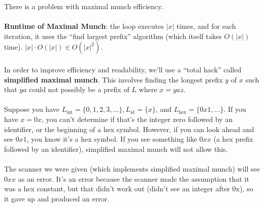 \documentclass[]{article}
\theoremstyle{definition}
\begin{document}
				There is a problem with maximal munch \textendash{} efficiency.
				\\ \\
				\textbf{Runtime of Maximal Munch}: the loop executes $|x|$ times, and for each iteration, it uses the ``find largest prefix'' algorithm (which itself takes $O(|x|)$ time). $|x| \cdot O(|x|) \in O(|x|^2)$.
				\\ \\
				In order to improve efficiency and readability, we'll use a ``total hack'' called \textbf{simplified maximal munch}. This involves finding the longest prefix $y$ of $x$ such that $ya$ could not possibly be a prefix of $L$ where $x = yaz$.
				\\ \\
				Suppose you have $L_{\text{int}} = \{0, 1, 2, 3, \ldots\}, L_{\text{id}} = \{x\}$, and $L_{\text{hex}} = \{0x1, \ldots\}$. If you have $x = 0x$, you can't determine if that's the integer zero followed by an identifier, or the beginning of a hex symbol. However, if you can look ahead and see $0x1$, you know it's a hex symbol. If you see something like $0xx$ (a hex prefix followed by an identifier), simplified maximal munch will not allow this.
				\\ \\
				The scanner we were given (which implements simplified maximal munch) will see $0xx$ as an error. It's an error because the scanner made the assumption that it was a hex constant, but that didn't work out (didn't see an integer after 0x), so it gave up and produced an error.
\end{document}
